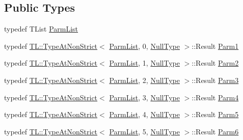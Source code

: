 \subsection*{Public Types}
\begin{DoxyCompactItemize}
\item 
typedef T\+List \mbox{\hyperlink{classUtil_1_1ObjectFactory_a46f003a5928e8a60140e0a74ac261c36}{Parm\+List}}
\item 
typedef \mbox{\hyperlink{structUtil_1_1TL_1_1TypeAtNonStrict}{T\+L\+::\+Type\+At\+Non\+Strict}}$<$ \mbox{\hyperlink{classUtil_1_1ObjectFactory_a46f003a5928e8a60140e0a74ac261c36}{Parm\+List}}, 0, \mbox{\hyperlink{classUtil_1_1NullType}{Null\+Type}} $>$\+::Result \mbox{\hyperlink{classUtil_1_1ObjectFactory_a47e4f863537be7a4f5f5972691bb0b57}{Parm1}}
\item 
typedef \mbox{\hyperlink{structUtil_1_1TL_1_1TypeAtNonStrict}{T\+L\+::\+Type\+At\+Non\+Strict}}$<$ \mbox{\hyperlink{classUtil_1_1ObjectFactory_a46f003a5928e8a60140e0a74ac261c36}{Parm\+List}}, 1, \mbox{\hyperlink{classUtil_1_1NullType}{Null\+Type}} $>$\+::Result \mbox{\hyperlink{classUtil_1_1ObjectFactory_ae438d0c17d1510e6fd7db9ac479a371f}{Parm2}}
\item 
typedef \mbox{\hyperlink{structUtil_1_1TL_1_1TypeAtNonStrict}{T\+L\+::\+Type\+At\+Non\+Strict}}$<$ \mbox{\hyperlink{classUtil_1_1ObjectFactory_a46f003a5928e8a60140e0a74ac261c36}{Parm\+List}}, 2, \mbox{\hyperlink{classUtil_1_1NullType}{Null\+Type}} $>$\+::Result \mbox{\hyperlink{classUtil_1_1ObjectFactory_ae5c679dd2f210e0a5ad257b336f754fb}{Parm3}}
\item 
typedef \mbox{\hyperlink{structUtil_1_1TL_1_1TypeAtNonStrict}{T\+L\+::\+Type\+At\+Non\+Strict}}$<$ \mbox{\hyperlink{classUtil_1_1ObjectFactory_a46f003a5928e8a60140e0a74ac261c36}{Parm\+List}}, 3, \mbox{\hyperlink{classUtil_1_1NullType}{Null\+Type}} $>$\+::Result \mbox{\hyperlink{classUtil_1_1ObjectFactory_a052f09d9e81b11d98bb53a52f327cf01}{Parm4}}
\item 
typedef \mbox{\hyperlink{structUtil_1_1TL_1_1TypeAtNonStrict}{T\+L\+::\+Type\+At\+Non\+Strict}}$<$ \mbox{\hyperlink{classUtil_1_1ObjectFactory_a46f003a5928e8a60140e0a74ac261c36}{Parm\+List}}, 4, \mbox{\hyperlink{classUtil_1_1NullType}{Null\+Type}} $>$\+::Result \mbox{\hyperlink{classUtil_1_1ObjectFactory_a11006cc1ea90957dd8e5604c2d9e069d}{Parm5}}
\item 
typedef \mbox{\hyperlink{structUtil_1_1TL_1_1TypeAtNonStrict}{T\+L\+::\+Type\+At\+Non\+Strict}}$<$ \mbox{\hyperlink{classUtil_1_1ObjectFactory_a46f003a5928e8a60140e0a74ac261c36}{Parm\+List}}, 5, \mbox{\hyperlink{classUtil_1_1NullType}{Null\+Type}} $>$\+::Result \mbox{\hyperlink{classUtil_1_1ObjectFactory_a9f80d25e0964c0e4c204373cd651397a}{Parm6}}

\end{DoxyCompactItemize}
